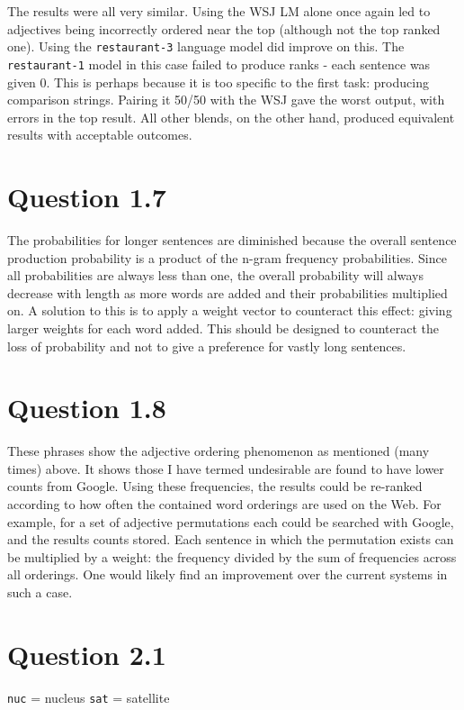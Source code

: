 \documentclass[a4paper,11pt,oneside]{article}
\begin{document}
The results were all very similar. Using the WSJ LM alone once again led to adjectives being incorrectly ordered near the top (although not the top ranked one). Using the \verb+restaurant-3+ language model did improve on this. The \verb+restaurant-1+ model in this case failed to produce ranks - each sentence was given 0. This is perhaps because it is too specific to the first task: producing comparison strings. Pairing it 50/50 with the WSJ gave the worst output, with errors in the top result. All other blends, on the other hand, produced equivalent results with acceptable outcomes. 

\section{Question 1.7}
The probabilities for longer sentences are diminished because the overall sentence production probability is a product of the n-gram frequency probabilities. Since all probabilities are always less than one, the overall probability will always decrease with length as more words are added and their probabilities multiplied on. A solution to this is to apply a weight vector to counteract this effect: giving larger weights for each word added. This should be designed to counteract the loss of probability and not to give a preference for vastly long sentences.

\section{Question 1.8}
These phrases show the adjective ordering phenomenon as mentioned (many times) above. It shows those I have termed undesirable are found to have lower counts from Google. Using these frequencies, the results could be re-ranked according to how often the contained word orderings are used on the Web. For example, for a set of adjective permutations each could be searched with Google, and the results counts stored. Each sentence in which the permutation exists can be multiplied by a weight: the frequency divided by the sum of frequencies across all orderings. One would likely find an improvement over the current systems in such a case.

\section{Question 2.1}
\verb+nuc+ = nucleus \verb+sat+ = satellite
\end{document}
